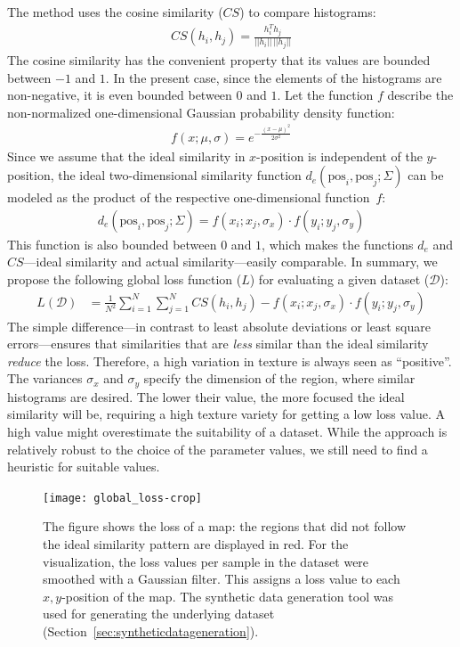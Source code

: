 \documentclass[11pt]{report}
\begin{document}
The method uses the cosine similarity ($CS$) to compare histograms:
\begin{align}
CS(h_i, h_j) = \frac{h_i^Th_j}{||h_i||\,||h_j||}
\end{align}
The cosine similarity has the convenient property that its values are
bounded between $-1$ and $1$. In the present case, since the elements
of the histograms are non-negative, it is even bounded between $0$ and
$1$. Let the function $f$ describe the non-normalized one-dimensional
Gaussian probability density function:
\begin{align}
  f(x; \mu, \sigma) = e^{- \frac{(x - \mu)^2}{2 \sigma ^ 2}}  
\end{align}
Since we assume that the ideal similarity in $x$-position is
independent of the $y$-position, the ideal two-dimensional similarity
function $d_e(\text{pos}_i, \text{pos}_j; \Sigma)$ can be modeled as
the product of the respective one-dimensional function~$f$:
\begin{align}
d_e(\text{pos}_i, \text{pos}_j; \Sigma) = f(x_i; x_j, \sigma_x) \cdot f(y_i;
y_j, \sigma_y)
\end{align}
This function is also bounded between $0$ and $1$, which makes the
functions $d_e$ and $CS$---ideal similarity and actual
similarity---easily comparable. In summary, we propose the following
global loss function ($L$) for evaluating a given dataset
($\mathcal{D}$):
\begin{align}
  L(\mathcal{D}) &= \frac{1}{N^2}\sum_{i = 1}^{N} \sum_{j = 1}^{N}
                   CS(h_i, h_j) - f(x_i; x_j, \sigma_x) \cdot f(y_i; y_j, \sigma_y)                  
\end{align}
The simple difference---in contrast to least absolute deviations or
least square errors---ensures that similarities that are \emph{less}
similar than the ideal similarity \emph{reduce} the loss. Therefore, a
high variation in texture is always seen as ``positive''. The
variances $\sigma_x$ and $\sigma_y$ specify the dimension of the
region, where similar histograms are desired. The lower their value,
the more focused the ideal similarity will be, requiring a high
texture variety for getting a low loss value. A high value might
overestimate the suitability of a dataset. While the approach is
relatively robust to the choice of the parameter values, we still need
to find a heuristic for suitable values.
\begin{figure}[h]
  \centering
  \texttt{[image: global\_loss-crop]}
  \caption{The figure shows the loss of a map: the regions that did
    not follow the ideal similarity pattern are displayed in red. For
    the visualization, the loss values per sample in the dataset were
    smoothed with a Gaussian filter. This assigns a loss value to each
    $x,y$-position of the map. The synthetic data generation tool was
    used for generating the underlying dataset
    (Section~\ref{sec:syntheticdatageneration}). }
  \label{fig:globalloss}
\end{figure}
\end{document}
